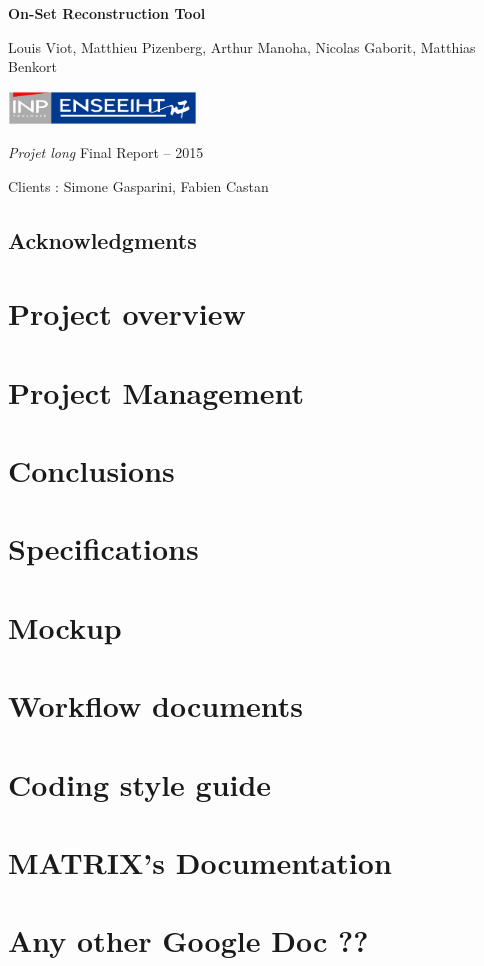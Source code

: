 \documentclass[a4paper]{report}
\title{\mytitle}
\author{\myauthor}
\date{From January, 19\up{th} to March, 13\up{th}}
\def\mytitle{On-Set Reconstruction Tool}
\def\myauthor{Louis Viot, Matthieu Pizenberg, Arthur Manoha, Nicolas
  Gaborit, Matthias Benkort}
\begin{document}
\begin{titlepage}
\centering

\null
\vfill

{\Huge\sffamily\bfseries\mytitle\par}
\vspace{1cm}
{\Large\myauthor\par}

\vfill
\vfill

\includegraphics[width=5cm]{img/inpn7.pdf}

\vfill

{\Large \emph{Projet long} Final Report -- 2015\par%
  Clients : Simone Gasparini, Fabien Castan\par}


\end{titlepage}

\tableofcontents

\newpage

\thispagestyle{empty}
\null
\vfill

\section*{Acknowledgments}


\chapter{Project overview}


\chapter{Project Management}


\chapter{Conclusions}


\appendix
\chapter{Specifications}
\chapter{Mockup}
\chapter{Workflow documents}
\chapter{Coding style guide}
\chapter{MATRIX's Documentation}
\chapter{Any other Google Doc ??}
\end{document}
